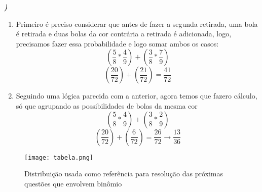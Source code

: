 \documentclass[12pt]{article}
\newcounter{instn}
\newcommand{\instnum}{\arabic{instn}}
\newcommand{\myline}[1]{
    \emph{\textbf{#1)}}
    \addtocounter{instn}{1}
}
\newenvironment{question}
 {
    \myline{\instnum} 
    }
    {
 }
\begin{document}
    \newpage
    \begin{question}
        \begin{enumerate}[label={\textbf{\alph*)}}]
            \item Primeiro é preciso considerar que antes de fazer a segunda 
            retirada, uma bola é retirada e duas bolas da cor contrária a retirada é adicionada,
            logo, precisamos fazer essa probabilidade e logo somar ambos os casos: 
            \[
                (\frac{5}{8} * \frac{4}{9}) + (\frac{3}{8} * \frac{7}{9})  
            \]
            \begin{equation}
                (\frac{20}{72}) + (\frac{21}{72}) = \frac{41}{72}
            \end{equation}
            \item Seguindo uma lógica parecida com a anterior, agora temos que fazero cálculo, só que 
            agrupando as possibilidades de bolas da mesma cor 
            \[
                (\frac{5}{8} * \frac{4}{9}) + (\frac{3}{8} * \frac{2}{9})  
            \]
            \begin{equation}
                (\frac{20}{72}) + (\frac{6}{72}) = \frac{26}{72} \rightarrow \frac{13}{36}
            \end{equation}
        \end{enumerate}
    \end{question}


    \begin{figure}[ht]
        \centering 
        \texttt{[image: tabela.png]}
        \caption{Distribuição usada como referência para resolução das próximas questões que envolvem binômio}
    \end{figure}

    \newpage
\end{document}
